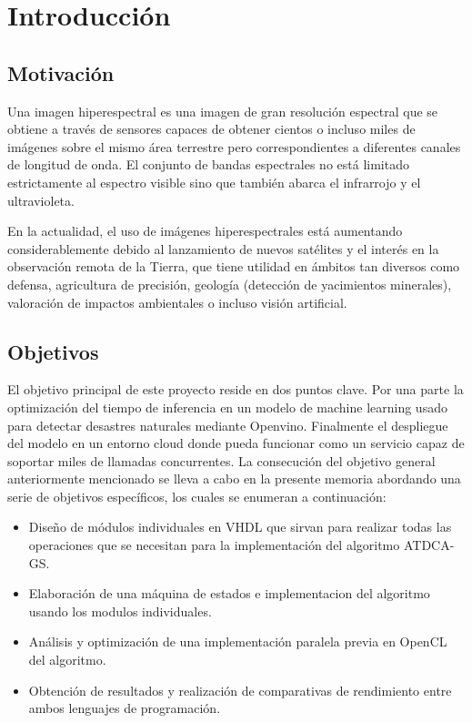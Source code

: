 \cleardoublepage


\chapter{Introducción}
\label{ch:chapter1}


\section{Motivación}

Una imagen hiperespectral es una imagen de gran resolución espectral que se obtiene a través de sensores capaces de obtener cientos o incluso miles de imágenes sobre el mismo área terrestre
pero correspondientes a diferentes canales de longitud de onda.
El conjunto de bandas espectrales no está limitado estrictamente al espectro visible sino que también abarca el infrarrojo y el ultravioleta.

En la actualidad, el uso de imágenes hiperespectrales está aumentando considerablemente debido al lanzamiento de nuevos satélites y el interés en la observación remota de la Tierra,
que tiene utilidad en ámbitos tan diversos como defensa, agricultura de precisión, geología (detección de yacimientos minerales), valoración de impactos ambientales o incluso visión artificial.

\section{Objetivos}

El objetivo principal de este proyecto reside en dos puntos clave.
Por una parte la optimización del tiempo de inferencia en un modelo de machine learning usado para detectar desastres naturales mediante Openvino.
Finalmente el despliegue del modelo en un entorno cloud donde pueda funcionar como un servicio capaz de soportar miles de llamadas concurrentes.
La consecución del objetivo general anteriormente mencionado se lleva a cabo en la
presente memoria abordando una serie de objetivos específicos, los cuales se enumeran a
continuación:
\begin{itemize}
    \item Diseño de módulos individuales en VHDL que sirvan para realizar todas las operaciones que se necesitan para la implementación del algoritmo ATDCA-GS.
    \item Elaboración de una máquina de estados e implementacion del algoritmo usando los modulos individuales.
    \item Análisis y optimización de una implementación paralela previa en OpenCL del algoritmo.
    \item Obtención de resultados y realización de comparativas de rendimiento entre ambos lenguajes de programación.
\end{itemize}

